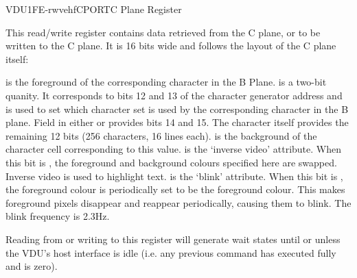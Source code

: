 \begin{ioport}{VDU}{1FE}{-rwvehf}{CPORT}{C Plane Register}

  This read/write register contains data retrieved from the C plane, or to be written to
  the C plane. It is 16 bits wide and follows the layout of the C plane itself:

  \begin{cbitfield}[8]
  \end{cbitfield}

  \begin{description}
     is the foreground  of the
    corresponding character in the B Plane.
     is a two-bit quanity. It corresponds to bits 12 and 13
    of the character generator address and is used to set which character set
    is used by the corresponding character in the B plane. Field  in
    either  or  provides bits 14 and 15. The character
    itself provides the remaining 12 bits (256 characters, 16 lines each).
     is the background  of the character
    cell corresponding to this value.
     is the ‘inverse video’ attribute. When this bit is
    , the foreground and background colours specified here are
    swapped. Inverse video is used to highlight text.
     is the ‘blink’ attribute. When this bit is , the
    foreground colour is periodically set to be the foreground colour. This
    makes foreground pixels disappear and reappear periodically, causing them
    to blink. The blink frequency is 2.3Hz.
  \end{description}

  Reading from or writing to this register will generate wait states until or unless the VDU's
  host interface is idle (i.e. any previous command has executed fully and
   is zero). 

\end{ioport}


